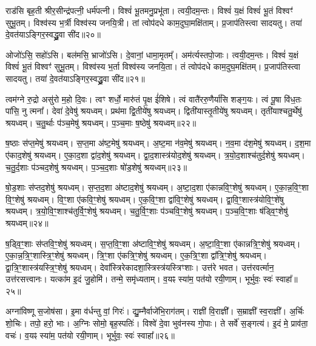    राड॑सि बृह॒ती श्रीर॒सीन्द्र॑पत्नी॒ धर्म॑पत्नी।
   विश्वं॑ भू॒तमनु॒प्रभू॑ता।
   त्वयी॒दम॒न्तः।
   विश्वं॑ य॒क्षं विश्वं॑ भू॒तं विश्वꣳ॑ सुभू॒तम्।
   विश्व॑स्य भ॒र्त्री विश्व॑स्य जनयि॒त्री।
   तां त्वोप॑दधे काम॒दुघा॒मक्षि॑ताम्।
   प्र॒जाप॑तिस्त्वा सादयतु।
   तया॑ दे॒वत॑याऽङ्गिर॒स्वद्ध्रु॒वा सी॑द॥२०॥

   ओजो॑ऽसि॒ सहो॑ऽसि।
   बल॑मसि॒ भ्राजो॑ऽसि।
   दे॒वानां॒ धामा॒मृतम्᳚।
   अम॑र्त्यस्तपो॒जाः।
   त्वयी॒दम॒न्तः।
   विश्वं॑ य॒क्षं विश्वं॑ भू॒तं विश्वꣳ॑ सुभू॒तम्।
   विश्व॑स्य भ॒र्ता विश्व॑स्य जनयि॒ता।
   तं त्वोप॑दधे काम॒दुघ॒मक्षि॑तम्।
   प्र॒जाप॑तिस्त्वा सादयतु।
   तया॑ दे॒वत॑याऽङ्गिर॒स्वद्ध्रु॒वा सी॑द॥२१॥
\anuvakamend

   त्वम॑ग्ने रु॒द्रो असु॑रो म॒हो दि॒वः।
   त्वꣳ शर्धो॒ मारु॑तं पृ॒क्ष ई॑शिषे।
   त्वं वातै॑ररु॒णैर्या॑सि शङ्ग॒यः।
   त्वं पू॒षा वि॑ध॒तः पा॑सि॒ नु त्मना᳚।
   देवा॑ दे॒वेषु॑ श्रयध्वम्।
   प्रथ॑मा द्वि॒तीये॑षु श्रयध्वम्।
   द्विती॑यास्तृ॒तीये॑षु श्रयध्वम्।
   तृती॑याश्चतु॒र्थेषु॑ श्रयध्वम्।
   च॒तु॒र्थाः प॑ञ्च॒मेषु॑ श्रयध्वम्।
   प॒ञ्च॒माः ष॒ष्ठेषु॑ श्रयध्वम्॥२२॥

   ष॒ष्ठाः स॑प्त॒मेषु॑ श्रयध्वम्।
   स॒प्त॒मा अ॑ष्ट॒मेषु॑ श्रयध्वम्।
   अ॒ष्ट॒मा न॑व॒मेषु॑ श्रयध्वम्।
   न॒व॒मा द॑श॒मेषु॑ श्रयध्वम्।
   द॒श॒मा ए॑काद॒शेषु॑ श्रयध्वम्।
   ए॒का॒द॒शा द्वा॑द॒शेषु॑ श्रयध्वम्।
   द्वा॒द॒शास्त्र॑योद॒शेषु॑ श्रयध्वम्।
   त्र॒यो॒द॒शाश्च॑तुर्द॒शेषु॑ श्रयध्वम्।
   च॒तु॒र्द॒शाः प॑ञ्चद॒शेषु॑ श्रयध्वम्।
   प॒ञ्च॒द॒शाः षो॑ड॒शेषु॑ श्रयध्वम्॥२३॥

   षो॒ड॒शाः स॑प्तद॒शेषु॑ श्रयध्वम्।
   स॒प्त॒द॒शा अ॑ष्टाद॒शेषु॑ श्रयध्वम्।
   अ॒ष्टा॒द॒शा ए॑कान्नवि॒ꣳ॒शेषु॑ श्रयध्वम्।
   ए॒का॒न्न॒वि॒ꣳ॒शा वि॒ꣳ॒शेषु॑ श्रयध्वम्।
   वि॒ꣳ॒शा ए॑कवि॒ꣳ॒शेषु॑ श्रयध्वम्।
   ए॒क॒वि॒ꣳ॒शा द्वा॑वि॒ꣳ॒शेषु॑ श्रयध्वम्।
   द्वा॒वि॒ꣳ॒शास्त्र॑योवि॒ꣳ॒शे॑षु श्रयध्वम्।
   त्र॒यो॒वि॒ꣳ॒शाश्च॑तुर्वि॒ꣳ॒शेषु॑ श्रयध्वम्।
   च॒तु॒र्वि॒ꣳ॒शाः प॑ञ्चवि॒ꣳ॒शेषु॑ श्रयध्वम्।
   प॒ञ्च॒वि॒ꣳ॒शाः ष॑ड्वि॒ꣳ॒शेषु॑ श्रयध्वम्॥२४॥

   ष॒ड्वि॒ꣳ॒शाः स॑प्तवि॒ꣳ॒शेषु॑ श्रयध्वम्।
   स॒प्त॒वि॒ꣳ॒शा अ॑ष्टावि॒ꣳ॒शेषु॑ श्रयध्वम्।
   अ॒ष्टा॒वि॒ꣳ॒शा ए॑कान्नत्रि॒ꣳ॒शेषु॑ श्रयध्वम्।
   ए॒का॒न्न॒त्रि॒ꣳ॒शास्त्रि॒ꣳ॒शेषु॑ श्रयध्वम्।
   त्रि॒ꣳ॒शा ए॑कत्रि॒ꣳ॒शेषु॑ श्रयध्वम्।
   ए॒क॒त्रि॒ꣳ॒शा द्वा᳚त्रि॒ꣳ॒शेषु॑ श्रयध्वम्।
   द्वा॒त्रि॒ꣳ॒शास्त्र॑य\-स्त्रि॒ꣳ॒\-शेषु॑ श्रयध्वम्।
   देवा᳚स्त्रिरेकादशा॒स्त्रिस्त्र॑य\-स्त्रिꣳशाः।
   उत्त॑रे भवत।
   उत्त॑रवर्त्मान॒ उत्त॑रसत्त्वानः।
   यत्का॑म इ॒दं जु॒होमि॑।
   तन्मे॒ समृ॑ध्यताम्।
   व॒यꣴ स्या॑म॒ पत॑यो रयी॒णाम्।
   भूर्भुवः॒ स्वः॑ स्वाहा᳚॥२५॥
   \anuvakamend
   
   अग्ना॑विष्णू स॒जोष॑सा।
   इ॒मा व॑र्धन्तु वां॒ गिरः॑।
   द्यु॒म्नैर्वाजे॑भि॒राग॑तम्।
   राज्ञी॑ वि॒राज्ञी᳚।
   स॒म्राज्ञी᳚ स्व॒राज्ञी᳚।
   अ॒र्चिः शो॒चिः।
   तपो॒ हरो॒ भाः।
   अ॒ग्निः सोमो॒ बृह॒स्पतिः॑।
   विश्वे॑ दे॒वा भुव॑नस्य गो॒पाः।
   ते सर्वे॑ स॒ङ्गत्य॑।
   इ॒दं मे॒ प्राव॑ता॒ वचः॑।
   व॒यꣴ स्या॑म॒ पत॑यो रयी॒णाम्।
   भूर्भुवः॒ स्वः॑ स्वाहा᳚॥२६॥
   \anuvakamend
   
